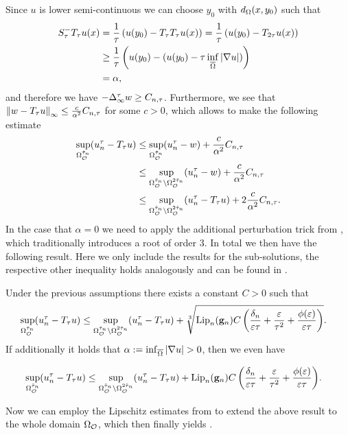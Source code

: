 %
Since $u$ is lower semi-continuous we can choose $y_0$ with $d_\Omega(x,y_0)$ such that
%
\begin{align*}
S^-_\tau T_\tau u(x) &= \frac{1}{\tau} \left(u(y_0) - T_\tau T_\tau u(x)\right) = \frac{1}{\tau} \left(u(y_0) - T_{2\tau} u(x)\right)\\ &\geq
\frac{1}{\tau} \left( u(y_0) - (u(y_0) - \tau \inf_{\overline{\Omega}} \left|\nabla u\right|)\right)\\ &= \alpha,
\end{align*}
%
and therefore we have $-\Delta_\infty^\tau w \geq C_{n,\tau}$. Furthermore, we see that $\left\|w- T_\tau u\right\|_\infty \leq \frac{c}{\alpha^2} C_{n,\tau}$ for some $c>0$, which allows to make the following estimate
%
\begin{align*}
\sup_{\Omega_{\mathcal{O}}^{\tilde{\tau}_n}}(u_n^\tau-T_\tau u) 
&\leq
\sup_{\Omega_{\mathcal{O}}^{\tilde{\tau}_n}}(u_n^\tau-w) + \frac{c}{\alpha^2} C_{n,\tau}\\
&\leq
\sup_{\Omega_{\mathcal{O}}^{\tilde{\tau}_n}\setminus\Omega_{\mathcal{O}}^{2\tilde{\tau}_n}}(u_n^\tau-w) + \frac{c}{\alpha^2} C_{n,\tau}\\
&\leq
\sup_{\Omega_{\mathcal{O}}^{\tilde{\tau}_n}\setminus\Omega_{\mathcal{O}}^{2\tilde{\tau}_n}}(u_n^\tau-T_\tau u) + 2\frac{c}{\alpha^2} C_{n,\tau}.
\end{align*}
%
%
In the case that $\alpha=0$ we need to apply the additional perturbation trick from \cite[Lem. 2.6.3]{smart2010infinity}, which traditionally introduces a root of order $3$. In total we then have the following result. Here we only include the results for the sub-solutions, the respective other inequality holds analogously and can be found in \cite[Prop. 5.16]{bungert2021uniform}.
%
\begin{proposition}{\cite[Prop. 5.16]{bungert2021uniform}}{}
Under the previous assumptions there exists a constant $C>0$ such that
%
\begin{align*}
\sup_{\Omega^{\tilde{\tau}_n}_{\mathcal{O}}}(u_n^\tau-T_\tau u) 
&\leq
\sup_{\Omega_{\mathcal{O}}^{\tilde{\tau}_n}\setminus\Omega_{\mathcal{O}}^{2\tilde{\tau}_n}}(u_n^\tau-T_\tau u) +
\sqrt[3]{\operatorname{Lip}_n(\mathbf{g}_n)C
\left(\frac{\delta_n}{\varepsilon\tau} +
\frac{\varepsilon}{\tau^2}+
\frac{\phi(\varepsilon)}{\varepsilon\tau}
\right)}.
\end{align*}
%
If additionally it holds that $\alpha:=\inf_{\closure\domain}\abs{\grad u}>0$, then we even have

\begin{align*}
\sup_{\Omega^{\tilde{\tau}_n}_{\mathcal{O}}}(u_n^\tau-T_\tau u) 
&\leq
\sup_{\Omega_{\mathcal{O}}^{\tilde{\tau}_n}\setminus\Omega_{\mathcal{O}}^{2\tilde{\tau}_n}}(u_n^\tau-T_\tau u) + 
{\operatorname{Lip}_n(\mathbf{g}_n)C
\left(
\frac{\delta_n}{\varepsilon\tau} + 
\frac{\varepsilon}{\tau^2}+
\frac{\phi(\varepsilon)}{\varepsilon\tau}
    \right)}.
\end{align*}
\end{proposition}
%
%
\noindent%
Now we can employ the Lipschitz estimates from \cite[Sec. 5.1]{bungert2021uniform} to extend the above result to the whole domain $\Omega_{\mathcal{O}}$, which then finally yields \cite[Thm. 2.2]{bungert2021uniform}.
%
%
%
